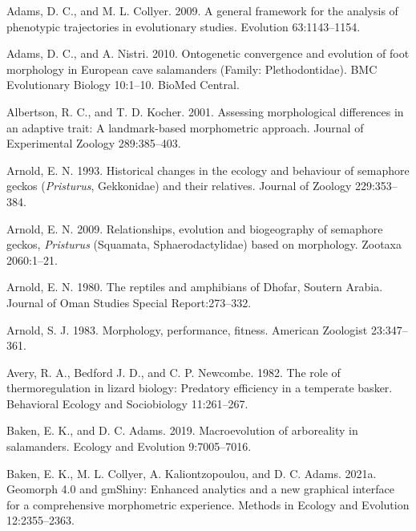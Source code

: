 \documentclass[
  11pt,
]{article}
\begin{document}
\setlength{\parindent}{-0.25in} \setlength{\leftskip}{0.25in}
\setlength{\parskip}{8pt} \noindent

\hypertarget{refs}{}
\leavevmode\hypertarget{ref-AdamsCollyer2009}{}%
Adams, D. C., and M. L. Collyer. 2009. A general framework for the
analysis of phenotypic trajectories in evolutionary studies. Evolution
63:1143--1154.

\leavevmode\hypertarget{ref-AdamsNistri2010}{}%
Adams, D. C., and A. Nistri. 2010. Ontogenetic convergence and evolution
of foot morphology in European cave salamanders (Family:
Plethodontidae). BMC Evolutionary Biology 10:1--10. BioMed Central.

\leavevmode\hypertarget{ref-Albertson2001}{}%
Albertson, R. C., and T. D. Kocher. 2001. Assessing morphological
differences in an adaptive trait: A landmark-based morphometric
approach. Journal of Experimental Zoology 289:385--403.

\leavevmode\hypertarget{ref-Arnold1993}{}%
Arnold, E. N. 1993. Historical changes in the ecology and behaviour of
semaphore geckos (\emph{Pristurus}, Gekkonidae) and their relatives.
Journal of Zoology 229:353--384.

\leavevmode\hypertarget{ref-ARNOLD2009}{}%
Arnold, E. N. 2009. Relationships, evolution and biogeography of
semaphore geckos, \emph{Pristurus} (Squamata, Sphaerodactylidae) based
on morphology. Zootaxa 2060:1--21.

\leavevmode\hypertarget{ref-Arnold1980}{}%
Arnold, E. N. 1980. The reptiles and amphibians of Dhofar, Soutern
Arabia. Journal of Oman Studies Special Report:273--332.

\leavevmode\hypertarget{ref-Arnold1983}{}%
Arnold, S. J. 1983. Morphology, performance, fitness. American Zoologist
23:347--361.

\leavevmode\hypertarget{ref-1982Avery}{}%
Avery, R. A., Bedford J. D., and C. P. Newcombe. 1982. The role of
thermoregulation in lizard biology: Predatory efficiency in a temperate
basker. Behavioral Ecology and Sociobiology 11:261--267.

\leavevmode\hypertarget{ref-Baken2019}{}%
Baken, E. K., and D. C. Adams. 2019. Macroevolution of arboreality in
salamanders. Ecology and Evolution 9:7005--7016.

\leavevmode\hypertarget{ref-Baken2021}{}%
Baken, E. K., M. L. Collyer, A. Kaliontzopoulou, and D. C. Adams. 2021a.
Geomorph 4.0 and gmShiny: Enhanced analytics and a new graphical
interface for a comprehensive morphometric experience. Methods in
Ecology and Evolution 12:2355--2363.
\end{document}
